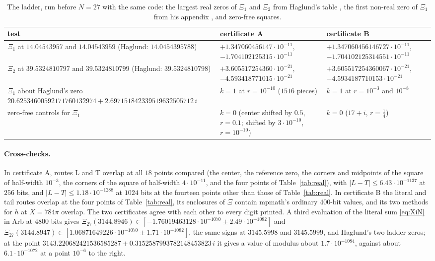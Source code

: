 \documentclass[11pt]{article}
\theoremstyle{plain}
\theoremstyle{definition}
\theoremstyle{remark}
\begin{document}
\begin{table}[ht]
\centering\small
\begin{tabular}{>{\raggedright\arraybackslash}p{}>{\raggedright\arraybackslash}p{}>{\raggedright\arraybackslash}p{}}
\toprule
test & certificate A & certificate B \\
\midrule
$\Xi_1$ at $14.04543957$ and $14.04543959$ (Haglund: $14.0454395788$) &
$+1.347060456147\cdot10^{-11}$, $-1.704102125315\cdot10^{-11}$ &
$+1.347060456146727\cdot10^{-11}$, $-1.704102125314551\cdot10^{-11}$ \\
$\Xi_2$ at $39.5324810797$ and $39.5324810799$ (Haglund: $39.5324810798$) &
$+3.605517254360\cdot10^{-21}$, $-4.593418771015\cdot10^{-21}$ &
$+3.605517254360067\cdot10^{-21}$, $-4.5934187710153\cdot10^{-21}$ \\
$\Xi_1$ about Haglund's zero $20.62534600592171760132974 +
2.697151842339519632505712\,i$ &
$k = 1$ at $r = 10^{-10}$ ($1516$ pieces) & $k = 1$ at $r = 10^{-3}$ and
$10^{-8}$ \\
zero-free controls for $\Xi_1$ & $k = 0$ (center shifted by $0.5$, $r = 0.1$;
shifted by $3\cdot10^{-10}$, $r = 10^{-10}$) & $k = 0$ ($17 + i$,
$r = \tfrac14$) \\
\bottomrule
\end{tabular}
\caption{The ladder, run before $N = 27$ with the same code: the largest real
zeros of $\Xi_1$ and $\Xi_2$ from Haglund's table \cite[p.~4]{Hag}, the first
non-real zero of $\Xi_1$ from his appendix \cite[p.~16]{Hag}, and zero-free
squares.}
\label{tab:ladder}
\end{table}

\paragraph{Cross-checks.} In certificate A, routes L and T overlap at all $18$
points compared (the center, the reference zero, the corners and midpoints of
the square of half-width $10^{-3}$, the corners of the square of half-width
$4\cdot10^{-11}$, and the four points of Table~\ref{tab:real}), with
$|L - T| \le 6.43\cdot10^{-1137}$ at $256$ bits, and
$|L - T| \le 1.18\cdot10^{-1288}$ at $1024$ bits at the
fourteen points other than those of Table~\ref{tab:real}. In certificate B the literal and
tail routes overlap at the four points of Table~\ref{tab:real}, its enclosures of
$\Xi$ contain mpmath's ordinary $400$-bit values, and its two methods for $h$ at
$X = 784\pi$ overlap. The two certificates agree with each other to every digit
printed. A third evaluation of the literal sum
\eqref{eq:XiN} in Arb at $4800$ bits gives
$\Xi_{27}(3144.8946) \in [-1.76019463128\cdot10^{-1070} \pm
2.49\cdot10^{-1082}]$ and $\Xi_{27}(3144.8947) \in [1.06871649226\cdot10^{-1070}
\pm 1.71\cdot10^{-1082}]$, the same signs at $3145.5998$ and $3145.5999$, and
Haglund's two ladder zeros; at the point
$3143.220682421536585287 + 0.3152587993782148453823\,i$ it gives a value of modulus
about $1.7\cdot10^{-1084}$, against about $6.1\cdot10^{-1072}$ at a point
$10^{-6}$ to the right.
\end{document}
